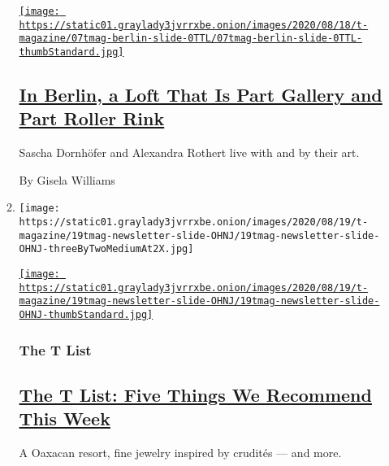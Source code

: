 \begin{enumerate}
\begin{enumerate}
    \href{/2020/08/19/t-magazine/berlin-infamous-skating-couple-design.html}{\texttt{[image: https://static01.graylady3jvrrxbe.onion/images/2020/08/18/t-magazine/07tmag-berlin-slide-0TTL/07tmag-berlin-slide-0TTL-thumbStandard.jpg]}}

    \hypertarget{in-berlin-a-loft-that-is-part-gallery-and-part-roller-rink}{%
    \subsection{\texorpdfstring{\href{/2020/08/19/t-magazine/berlin-infamous-skating-couple-design.html}{In
    Berlin, a Loft That Is Part Gallery and Part Roller
    Rink}}{In Berlin, a Loft That Is Part Gallery and Part Roller Rink}}\label{in-berlin-a-loft-that-is-part-gallery-and-part-roller-rink}}

    Sascha Dornhöfer and Alexandra Rothert live with and by their art.

    By Gisela Williams
  \item
    \texttt{[image: https://static01.graylady3jvrrxbe.onion/images/2020/08/19/t-magazine/19tmag-newsletter-slide-OHNJ/19tmag-newsletter-slide-OHNJ-threeByTwoMediumAt2X.jpg]}

    \href{/2020/08/20/t-magazine/monte-uzulu-vivanterre-emme-parsons.html}{\texttt{[image: https://static01.graylady3jvrrxbe.onion/images/2020/08/19/t-magazine/19tmag-newsletter-slide-OHNJ/19tmag-newsletter-slide-OHNJ-thumbStandard.jpg]}}

    \hypertarget{the-t-list}{%
    \subsubsection{The T List}\label{the-t-list}}

    \hypertarget{the-t-list-five-things-we-recommend-this-week}{%
    \subsection{\texorpdfstring{\href{/2020/08/20/t-magazine/monte-uzulu-vivanterre-emme-parsons.html}{The
    T List: Five Things We Recommend This
    Week}}{The T List: Five Things We Recommend This Week}}\label{the-t-list-five-things-we-recommend-this-week}}

    A Oaxacan resort, fine jewelry inspired by crudités --- and more.
  \end{enumerate}
\end{enumerate}

